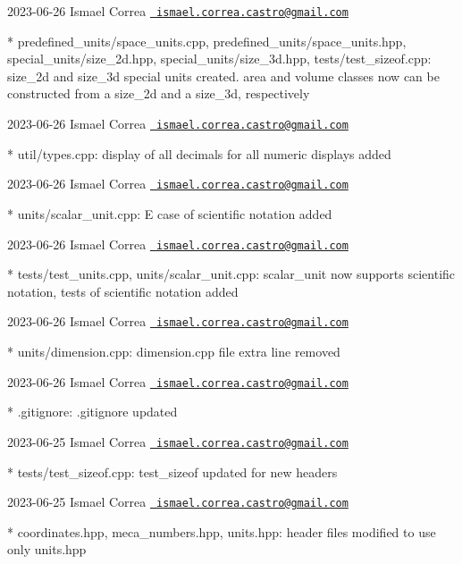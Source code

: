  2023-\/06-\/26 Ismael Correa \href{mailto:ismael.correa.castro@gmail.com}{\texttt{ ismael.\+correa.\+castro@gmail.\+com}} \begin{DoxyVerb}* predefined_units/space_units.cpp,
predefined_units/space_units.hpp, special_units/size_2d.hpp,
special_units/size_3d.hpp, tests/test_sizeof.cpp: size_2d and
size_3d special units created. area and volume classes now can be
constructed from a size_2d and a size_3d, respectively
\end{DoxyVerb}
 2023-\/06-\/26 Ismael Correa \href{mailto:ismael.correa.castro@gmail.com}{\texttt{ ismael.\+correa.\+castro@gmail.\+com}} \begin{DoxyVerb}* util/types.cpp: display of all decimals for all numeric displays
added
\end{DoxyVerb}
 2023-\/06-\/26 Ismael Correa \href{mailto:ismael.correa.castro@gmail.com}{\texttt{ ismael.\+correa.\+castro@gmail.\+com}} \begin{DoxyVerb}* units/scalar_unit.cpp: E case of scientific notation added
\end{DoxyVerb}
 2023-\/06-\/26 Ismael Correa \href{mailto:ismael.correa.castro@gmail.com}{\texttt{ ismael.\+correa.\+castro@gmail.\+com}} \begin{DoxyVerb}* tests/test_units.cpp, units/scalar_unit.cpp: scalar_unit now
supports scientific notation, tests of scientific notation added
\end{DoxyVerb}
 2023-\/06-\/26 Ismael Correa \href{mailto:ismael.correa.castro@gmail.com}{\texttt{ ismael.\+correa.\+castro@gmail.\+com}} \begin{DoxyVerb}* units/dimension.cpp: dimension.cpp file extra line removed
\end{DoxyVerb}
 2023-\/06-\/26 Ismael Correa \href{mailto:ismael.correa.castro@gmail.com}{\texttt{ ismael.\+correa.\+castro@gmail.\+com}} \begin{DoxyVerb}* .gitignore: .gitignore updated
\end{DoxyVerb}
 2023-\/06-\/25 Ismael Correa \href{mailto:ismael.correa.castro@gmail.com}{\texttt{ ismael.\+correa.\+castro@gmail.\+com}} \begin{DoxyVerb}* tests/test_sizeof.cpp: test_sizeof updated for new headers
\end{DoxyVerb}
 2023-\/06-\/25 Ismael Correa \href{mailto:ismael.correa.castro@gmail.com}{\texttt{ ismael.\+correa.\+castro@gmail.\+com}} \begin{DoxyVerb}* coordinates.hpp, meca_numbers.hpp, units.hpp: header files
modified to use only units.hpp
\end{DoxyVerb}
